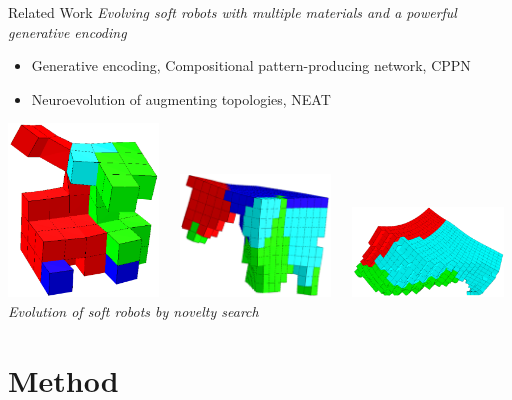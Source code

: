 \documentclass[6pt]{beamer}
\begin{document}
\begin{frame}{Related Work}
\textit{Evolving soft robots with multiple materials and a powerful generative encoding}~
\begin{itemize}
\item Generative encoding, Compositional pattern-producing network, CPPN
\item Neuroevolution of augmenting topologies, NEAT
\end{itemize}
\vspace{0.3cm}
\includegraphics[width=0.3\textwidth,height=0.25\textheight]{../Figures/Misc/unshacklingEvolutionFigure1.png}\	\	\	
\includegraphics[width=0.3\textwidth,height=0.25\textheight]{../Figures/Misc/unshacklingEvolutionFigure2.png}\	\	\	
\includegraphics[width=0.3\textwidth,height=0.25\textheight]{../Figures/Misc/unshacklingEvolutionFigure3.png}\\[0.8cm]
\textit{Evolution of soft robots by novelty search}
\end{frame}









\section{Method}
\end{document}
